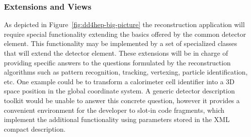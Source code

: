\subsubsection{Extensions and Views}
\label{subsect:extesions-and-views}

\noindent
As depicted in Figure~\ref{fig:dd4hep-big-picture} the reconstruction 
application will require special functionality extending the basics 
offered by the common detector element. This functionality may be
implemented by a set of specialized classes that will extend the 
detector element. These extensions will be in charge 
of providing specific answers to the questions formulated by the 
reconstruction algorithms such as pattern recognition, tracking, vertexing, 
particle identification, etc. One example could be to transform a calorimeter 
cell identifier into a 3D space position in the global coordinate system.
A generic detector description toolkit would be unable 
to answer this concrete question, however it provides a convenient 
environment for the developer to slot-in code fragments, which implement the
additional functionality using parameters stored
in the XML compact description.


